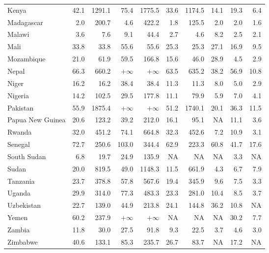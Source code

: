 \begin{table}[b]
{\begin{tabular}[t]{lrrrrrrrrr}
Kenya & 42.1 & 1291.1 & 75.4 & 1775.5 & 33.6 & 1174.5 & 14.1 & 19.3 & 6.4\\
Madagascar & 2.0 & 200.7 & 4.6 & 422.2 & 1.8 & 125.5 & 2.0 & 2.0 & 1.6\\
Malawi & 3.6 & 7.6 & 9.1 & 44.4 & 2.7 & 4.6 & 8.2 & 2.5 & 2.1\\
Mali & 33.8 & 33.8 & 55.6 & 55.6 & 25.3 & 25.3 & 27.1 & 16.9 & 9.5\\
Mozambique & 21.0 & 61.9 & 59.5 & 166.8 & 15.6 & 46.0 & 28.9 & 4.5 & 2.9\\
Nepal & 66.3 & 660.2 & $+\infty$ & $+\infty$ & 63.5 & 635.2 & 38.2 & 56.9 & 10.8\\
Niger & 16.2 & 16.2 & 38.4 & 38.4 & 11.3 & 11.3 & 8.0 & 5.0 & 2.9\\
Nigeria & 14.2 & 102.5 & 29.5 & 177.8 & 11.1 & 79.9 & 5.9 & 7.0 & 4.1\\
Pakistan & 55.9 & 1875.4 & $+\infty$ & $+\infty$ & 51.2 & 1740.1 & 20.1 & 36.3 & 11.5\\
Papua New Guinea & 20.6 & 123.2 & 39.2 & 212.0 & 16.1 & 95.1 & NA & 11.1 & 3.6\\
Rwanda & 32.0 & 451.2 & 74.1 & 664.8 & 32.3 & 452.6 & 7.2 & 10.9 & 3.1\\
Senegal & 72.7 & 250.6 & 103.0 & 344.4 & 62.9 & 223.3 & 60.8 & 41.7 & 17.6\\
South Sudan & 6.8 & 19.7 & 24.9 & 135.9 & NA & NA & NA & 3.3 & NA\\
Sudan & 20.0 & 819.5 & 49.0 & 1148.3 & 11.5 & 661.9 & 4.3 & 6.7 & 7.9\\
Tanzania & 23.7 & 378.8 & 57.8 & 567.6 & 19.4 & 345.9 & 9.6 & 7.5 & 3.3\\
Uganda & 29.9 & 314.0 & 77.3 & 483.3 & 23.3 & 281.0 & 10.4 & 8.5 & 3.7\\
Uzbekistan & 22.7 & 139.0 & 44.9 & 213.8 & 24.1 & 144.8 & 36.2 & 10.8 & NA\\
Yemen & 60.2 & 237.9 & $+\infty$ & $+\infty$ & NA & NA & NA & 30.2 & 7.7\\
Zambia & 11.8 & 30.0 & 27.5 & 91.8 & 9.3 & 22.5 & 3.7 & 4.6 & 3.0\\
Zimbabwe & 40.6 & 133.1 & 85.3 & 235.7 & 26.7 & 83.7 & NA & 17.2 & NA\\
\bottomrule
\end{tabular}}
\end{table}